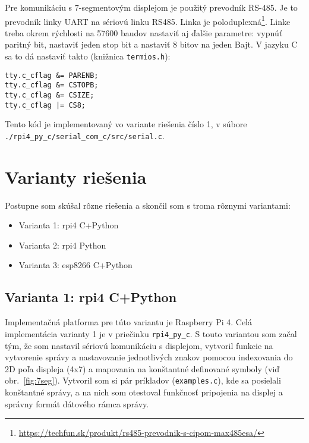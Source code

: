 \documentclass[a4paper, 12pt]{article}
\begin{document}
Pre komunikáciu s 7-segmentovým displejom je použitý prevodník RS-485. Je to prevodník linky UART na sériovú linku RS485. Linka je poloduplexná\footnote{\url{https://techfun.sk/produkt/rs485-prevodnik-s-cipom-max485esa/}}. Linke treba okrem rýchlosti na 57600 baudov nastaviť aj ďalšie parametre: vypnúť paritný bit, nastaviť jeden stop bit a nastaviť 8 bitov na jeden Bajt. V jazyku C sa to dá nastaviť takto (knižnica \texttt{termios.h}):

\begin{verbatim}
tty.c_cflag &= PARENB; 
tty.c_cflag &= CSTOPB;
tty.c_cflag &= CSIZE;
tty.c_cflag |= CS8;
\end{verbatim}

Tento kód je implementovaný vo variante riešenia číslo 1, v súbore \texttt{./rpi4\_py\_c/serial\_com\_c/src/serial.c}.

\section{Varianty riešenia}

Postupne som skúšal rôzne riešenia a skončil som s troma rôznymi variantami:

\begin{itemize}
    \item Varianta 1: rpi4 C+Python
    \item Varianta 2: rpi4 Python
    \item Varianta 3: esp8266 C+Python
\end{itemize}

\subsection{Varianta 1: rpi4 C+Python}\label{var1}

Implementačná platforma pre túto variantu je Raspberry Pi 4. Celá implementácia varianty 1 je v priečinku \texttt{rpi4\_py\_c}. S touto variantou som začal tým, že som nastavil sériovú komunikáciu s displejom, vytvoril funkcie na vytvorenie správy a nastavovanie jednotlivých znakov pomocou indexovania do 2D poľa displeja (4x7) a mapovania na konštantné definované symboly (viď obr.~\ref{fig:7seg}). Vytvoril som si pár príkladov (\texttt{examples.c}), kde sa posielali konštantné správy, a na nich som otestoval funkčnosť pripojenia na displej a správny formát dátového rámca správy.
\end{document}
